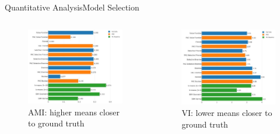 \documentclass[xcolor=dvipsnames]{beamer}
\begin{document}
\begin{frame}{Quantitative Analysis}{Model Selection}
  \small
  \begin{columns}
  \begin{figure}
    \includegraphics[width=\linewidth]{ami}
    \caption{AMI: higher means closer to ground truth}
  \end{figure}
  \begin{figure}
    \includegraphics[width=\linewidth]{vi}
    \caption{VI: lower means closer to ground truth}
  \end{figure}
  \end{columns}
\end{frame}
\end{document}
